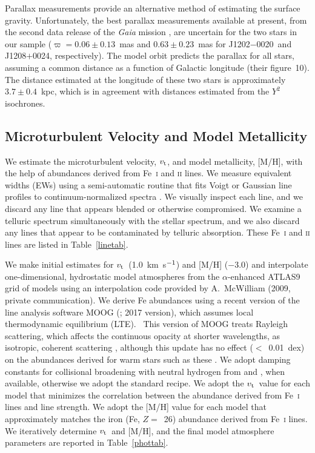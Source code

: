 \documentclass[twocolumn,tighten]{aastex62}
\newcommand{\jtwo}{J1202$-$0020}
\newcommand{\jeight}{J1208$+$0024}
\newcommand{\kmsec}{\mbox{km~s$^{\rm -1}$}}
\newcommand{\vt}{\mbox{$v_{\rm t}$}}
\begin{document}
Parallax measurements provide an alternative method of
estimating the surface gravity.
Unfortunately, the best parallax measurements available at present,
from the second data release of the \textit{Gaia} mission
\citep{lindegren18}, 
are uncertain for the two stars in our sample
($\varpi = 0.06 \pm 0.13$~mas and 
$0.63 \pm 0.23$~mas for \jtwo\ and \jeight, respectively).
The  model orbit predicts the
parallax for all stars, assuming a common distance as a function of
Galactic longitude (their figure~10).
The distance estimated at the longitude of these two stars
is approximately $3.7 \pm 0.4$~kpc, 
which is in agreement with distances
estimated from the $Y^{2}$ isochrones.


\subsection{Microturbulent Velocity and Model Metallicity}
\label{microturbulent}


We estimate the microturbulent velocity, \vt, and model metallicity, [M/H],
with the help of abundances derived from 
Fe~\textsc{i} and \textsc{ii} lines.
We measure equivalent widths (EWs) 
using a semi-automatic 
routine that fits Voigt or Gaussian line profiles to 
continuum-normalized spectra
\citep{roederer14c}.
We visually inspect each line, and
we discard any line that appears blended 
or otherwise compromised.
We examine a telluric spectrum simultaneously
with the stellar spectrum, and we also discard 
any lines that appear to be contaminated by
telluric absorption.
These Fe~\textsc{i} and \textsc{ii} lines are listed in 
Table~\ref{linetab}.



We make initial estimates for \vt\ (1.0~\kmsec) and [M/H] ($-$3.0)
and interpolate one-dimensional, 
hydrostatic model atmospheres from the $\alpha$-enhanced
ATLAS9 grid of models \citep{castelli04}
using an interpolation code provided by
A.\ McWilliam (2009, private communication).  
We derive Fe abundances 
using a recent version of the 
line analysis software MOOG
(\citealt{sneden73}; 2017 version), which
assumes local thermodynamic equilibrium (LTE).~
This version of MOOG treats
Rayleigh scattering, which affects 
the continuous opacity at shorter wavelengths,
as isotropic, coherent scattering
\citep{sobeck11}, 
although this update
has no effect ($<$~0.01~dex) on the abundances derived
for warm stars such as these
\citep{roederer18b}.
We adopt damping constants for collisional broadening
with neutral hydrogen from \citet{barklem00h}
and \citet{barklem05feii}, when available,
otherwise
we adopt the standard \citet{unsold55} recipe.
We adopt the \vt\ value for each model that 
minimizes the correlation between
the abundance derived from Fe~\textsc{i} lines
and line strength.
We adopt the [M/H] value for each model that
approximately matches the iron 
(Fe, $Z =$~26) abundance derived from Fe~\textsc{i} lines.
We iteratively determine \vt\ and [M/H], and the final 
model atmosphere parameters are reported in Table~\ref{phottab}.
\end{document}
